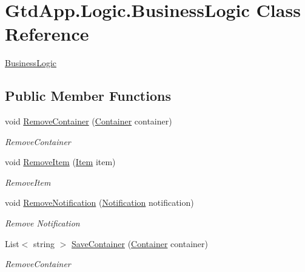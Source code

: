 \hypertarget{class_gtd_app_1_1_logic_1_1_business_logic}{}\section{Gtd\+App.\+Logic.\+Business\+Logic Class Reference}
\label{class_gtd_app_1_1_logic_1_1_business_logic}


\mbox{\hyperlink{class_gtd_app_1_1_logic_1_1_business_logic}{Business\+Logic}}  


\subsection*{Public Member Functions}
\begin{DoxyCompactItemize}
\item 
void \mbox{\hyperlink{class_gtd_app_1_1_logic_1_1_business_logic_a3f4cfe75f394a2ddc67edb42ef46cfdf}{Remove\+Container}} (\mbox{\hyperlink{class_gtd_app_1_1_data_1_1_container}{Container}} container)
\begin{DoxyCompactList}\small\item\em Remove\+Container \end{DoxyCompactList}\item 
void \mbox{\hyperlink{class_gtd_app_1_1_logic_1_1_business_logic_a8883b064d4c46a3a23b59650a86375a7}{Remove\+Item}} (\mbox{\hyperlink{class_gtd_app_1_1_data_1_1_item}{Item}} item)
\begin{DoxyCompactList}\small\item\em Remove\+Item \end{DoxyCompactList}\item 
void \mbox{\hyperlink{class_gtd_app_1_1_logic_1_1_business_logic_a5e37ed52aa905917ea518507f0830ecc}{Remove\+Notification}} (\mbox{\hyperlink{class_gtd_app_1_1_data_1_1_notification}{Notification}} notification)
\begin{DoxyCompactList}\small\item\em Remove Notification \end{DoxyCompactList}\item 
List$<$ string $>$ \mbox{\hyperlink{class_gtd_app_1_1_logic_1_1_business_logic_af56ec90b26a3fa39f67a6c54e3be2f9d}{Save\+Container}} (\mbox{\hyperlink{class_gtd_app_1_1_data_1_1_container}{Container}} container)
\begin{DoxyCompactList}\small\item\em Remove\+Container \end{DoxyCompactList}\item 

\end{DoxyCompactItemize}
